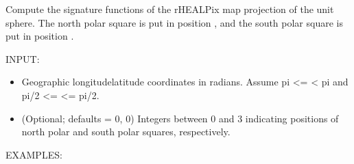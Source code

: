 \documentclass[a4paper,12ptopenany,oneside,english]{sphinxmanual}
\begin{document}

\begin{fulllineitems}
\label{\detokenize{pj_rhealpix:rhealpixdggs.pj_rhealpix.rhealpix_sphere}}
\pysigstartsignatures
{}
\pysigstopsignatures
\sphinxAtStartPar
Compute the signature functions of the rHEALPix map projection of
the unit sphere.
The north polar square is put in position , and the
south polar square is put in position .

\sphinxAtStartPar
INPUT:
\begin{itemize}
\item {} 
\sphinxAtStartPar
{} \sphinxhyphen{}Geographic longitude\sphinxhyphen{}latitude coordinates in radians.
Assume \sphinxhyphen{}pi \textless{}=  \textless{} pi and \sphinxhyphen{}pi/2 \textless{}=  \textless{}= pi/2.

\item {} 
\sphinxAtStartPar
{} \sphinxhyphen{} (Optional; defaults = 0, 0) Integers
between 0 and 3 indicating positions of north polar and
south polar squares, respectively.

\end{itemize}

\sphinxAtStartPar
EXAMPLES:

\begin{sphinxVerbatim}[commandchars=\\\{\}]
  
\end{sphinxVerbatim}


\end{fulllineitems}
\end{document}
